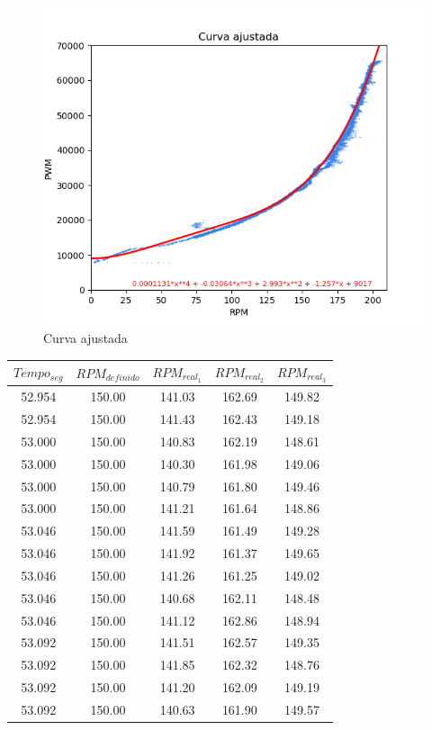 	\begin{figure}[htb]
		\centering
		\includegraphics{figures/curva_ajustada}
		\caption{Curva ajustada}
		\label{fig:curva_ajustada}
	\end{figure}
	
	
	
	\begin{quadro}[htb]
		\caption{\label{medicao_motores}Medição rpms motores}
		 \begin{tabular}{|c|c|c|c|c|}
			\hline
			\textbf{$Tempo_{seg}$} & \textbf{$RPM_{definido}$} & \textbf{$RPM_{real_{1}}$} & \textbf{$RPM_{real_{2}}$} & \textbf{$RPM_{real_{3}}$} \\ \hline
			52.954 & 150.00  & 141.03 & 162.69 & 149.82 \\ \hline
			52.954 & 150.00  & 141.43 & 162.43 & 149.18 \\ \hline
			53.000 & 150.00  & 140.83 & 162.19 & 148.61 \\ \hline
			53.000 & 150.00  & 140.30 & 161.98 & 149.06 \\ \hline
			53.000 & 150.00  & 140.79 & 161.80 & 149.46 \\ \hline
			53.000 & 150.00  & 141.21 & 161.64 & 148.86 \\ \hline
			53.046 & 150.00  & 141.59 & 161.49 & 149.28 \\ \hline
			53.046 & 150.00  & 141.92 & 161.37 & 149.65 \\ \hline
			53.046 & 150.00  & 141.26 & 161.25 & 149.02 \\ \hline
			53.046 & 150.00  & 140.68 & 162.11 & 148.48 \\ \hline
			53.046 & 150.00  & 141.12 & 162.86 & 148.94 \\ \hline
			53.092 & 150.00  & 141.51 & 162.57 & 149.35 \\ \hline
			53.092 & 150.00  & 141.85 & 162.32 & 148.76 \\ \hline
			53.092 & 150.00  & 141.20 & 162.09 & 149.19 \\ \hline
			53.092 & 150.00  & 140.63 & 161.90 & 149.57 \\ \hline
		\end{tabular}
	\end{quadro}
	
